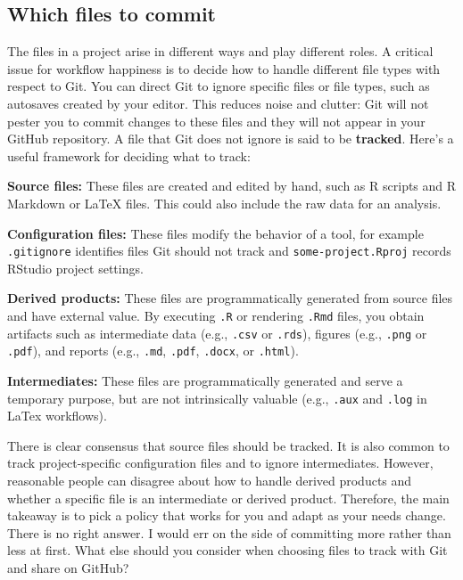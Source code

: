 \documentclass[12pt]{article}
\begin{document}
\subsection{Which files to commit}\label{which-files-to-commit}

The files in a project arise in different ways and play different roles.
A critical issue for workflow happiness is to decide how to handle
different file types with respect to Git. You can direct Git to ignore
specific files or file types, such as autosaves created by your editor.
This reduces noise and clutter: Git will not pester you to commit
changes to these files and they will not appear in your GitHub
repository. A file that Git does not ignore is said to be
\textbf{tracked}. Here's a useful framework for deciding what to track:

\textbf{Source files:} These files are created and edited by hand, such
as R scripts and R Markdown or LaTeX files. This could also include the
raw data for an analysis.

\textbf{Configuration files:} These files modify the behavior of a tool,
for example \texttt{.gitignore} identifies files Git should not track
and \texttt{some-project.Rproj} records RStudio project settings.

\textbf{Derived products:} These files are programmatically generated
from source files and have external value. By executing \texttt{.R} or
rendering \texttt{.Rmd} files, you obtain artifacts such as intermediate
data (e.g., \texttt{.csv} or \texttt{.rds}), figures (e.g.,
\texttt{.png} or \texttt{.pdf}), and reports (e.g., \texttt{.md},
\texttt{.pdf}, \texttt{.docx}, or \texttt{.html}).

\textbf{Intermediates:} These files are programmatically generated and
serve a temporary purpose, but are not intrinsically valuable (e.g.,
\texttt{.aux} and \texttt{.log} in LaTex workflows).

There is clear consensus that source files should be tracked. It is also
common to track project-specific configuration files and to ignore
intermediates. However, reasonable people can disagree about how to
handle derived products and whether a specific file is an intermediate
or derived product. Therefore, the main takeaway is to pick a policy
that works for you and adapt as your needs change. There is no right
answer. I would err on the side of committing more rather than less at
first. What else should you consider when choosing files to track with
Git and share on GitHub?
\end{document}
